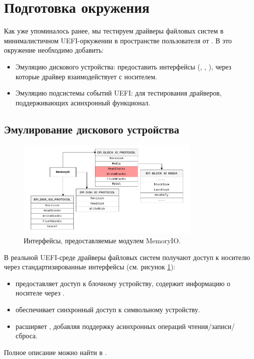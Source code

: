 \section{Подготовка окружения}
Как уже упоминалось ранее, мы тестируем драйверы файловых систем в минималистичном UEFI-оркужении в пространстве пользователя от \cite{OpenCorePkg}. В это окружение необходимо добавить:
\begin{itemize}
	\item Эмуляцию дискового устройства: предоставить интерфейсы (, , ), через которые драйвер взаимодействует с носителем.
	\item Эмуляцию подсистемы событий UEFI: для тестирования драйверов, поддерживающих асинхронный функционал.
\end{itemize} 

\subsection{Эмулирование дискового устройства}
\begin{figure}[htbp]
	\centering %
	\includegraphics[width=0.8\textwidth]{MemoryIo.pdf} %
	\caption{Интерфейсы, предоставляемые модулем MemoryIO.} %
	\label{env:pic:memoryio} %
\end{figure}

В реальной UEFI-среде драйверы файловых систем получают доступ к носителю через стандартизированные интерфейсы (см. рисунок \ref{env:pic:memoryio}):
\begin{itemize}
	\item{} предоставляет доступ к блочному устройству, содержит информацию о носителе через .\item{} обеспечивает синхронный доступ к символьному устройству.\item{} расширяет , добавляя поддержку асинхронных операций чтения/записи/сброса.
\end{itemize}
Полное описание можно найти в \cite{UEFISpec}.

